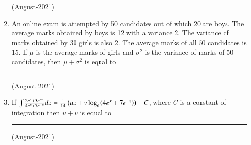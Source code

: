 \documentclass[journal]{IEEEtran}
\begin{document}
\begin{enumerate}
    \hfill (August-2021)
    
    \item An online exam is attempted by 50 candidates out of which 20 are boys. The average marks obtained by boys is 12 with a variance 2. The variance of marks obtained by 30 girls is also 2. The average marks of all 50 candidates is 15. If $\mu$ is the average marks of girls and $\sigma ^2$
 is the variance of marks of 50 candidates, then 
$\mu + \sigma^2$ is equal to \rule{1.5cm}{0.15mm}

\hfill(August-2021)
\item If $\int \frac{2e^x + 3e^{-x}}{4e^x+ 7e^{-x}}dx = \frac{1}{14} \left(ux + v \log_e \left(4e^x + 7e^{-x}\right)\right) + C$, where $C$ is a constant of integration then $u + v$ is equal to \rule{1cm}{0.15mm}

\hfill (August-2021)
\end{enumerate}
\end{document}
